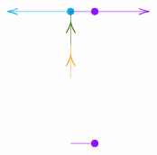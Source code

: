 \documentclass[12pt]{article}
\begin{document}
\[\begin{tikzpicture}[x=0.75pt,y=0.75pt,yscale=-1,xscale=1]
    \draw [color={rgb, 255:red, 144; green, 19; blue, 254 }  ,draw opacity=1 ]   (119.98,199.6) -- (145.63,199.6) ;
    \draw [shift={(145.63,199.6)}, rotate = 0] [color={rgb, 255:red, 144; green, 19; blue, 254 }  ,draw opacity=1 ][fill={rgb, 255:red, 144; green, 19; blue, 254 }  ,fill opacity=1 ][line width=0.75]      (0, 0) circle [x radius= 3.35, y radius= 3.35]   ;
    \draw [color={rgb, 255:red, 144; green, 19; blue, 254 }  ,draw opacity=1 ]   (145.63,60.46) -- (201.55,60.46) ;
    \draw [shift={(203.55,60.46)}, rotate = 180] [color={rgb, 255:red, 144; green, 19; blue, 254 }  ,draw opacity=1 ][line width=0.75]    (10.93,-3.29) .. controls (6.95,-1.4) and (3.31,-0.3) .. (0,0) .. controls (3.31,0.3) and (6.95,1.4) .. (10.93,3.29)   ;
    \draw [color=cyan  ,draw opacity=1 ]   (119.98,60.46) -- (54.75,60.46) ;
    \draw [shift={(52.75,60.46)}, rotate = 360] [color=cyan  ,draw opacity=1 ][line width=0.75]    (10.93,-3.29) .. controls (6.95,-1.4) and (3.31,-0.3) .. (0,0) .. controls (3.31,0.3) and (6.95,1.4) .. (10.93,3.29)   ;
    \draw [shift={(119.98,60.46)}, rotate = 180] [color=cyan  ,draw opacity=1 ][fill=cyan  ,fill opacity=1 ][line width=0.75]      (0, 0) circle [x radius= 3.35, y radius= 3.35]   ;
    \draw [color={rgb, 255:red, 144; green, 19; blue, 254 }  ,draw opacity=1 ]   (119.98,60.46) -- (145.63,60.46) ;
    \draw [shift={(145.63,60.46)}, rotate = 0] [color={rgb, 255:red, 144; green, 19; blue, 254 }  ,draw opacity=1 ][fill={rgb, 255:red, 144; green, 19; blue, 254 }  ,fill opacity=1 ][line width=0.75]      (0, 0) circle [x radius= 3.35, y radius= 3.35]   ;
    \draw [color={rgb, 255:red, 245; green, 166; blue, 35 }  ,draw opacity=1 ]   (119.98,130.39) -- (120.15,95.86) ;
    \draw [shift={(120.1,107.13)}, rotate = 90.28] [color={rgb, 255:red, 245; green, 166; blue, 35 }  ,draw opacity=1 ][line width=0.75]    (10.93,-4.9) .. controls (6.95,-2.3) and (3.31,-0.67) .. (0,0) .. controls (3.31,0.67) and (6.95,2.3) .. (10.93,4.9)   ;
    \draw [color={rgb, 255:red, 65; green, 117; blue, 5 }  ,draw opacity=1 ]   (120.15,95.86) -- (120.15,60.46) ;
    \draw [shift={(120.15,72.16)}, rotate = 90] [color={rgb, 255:red, 65; green, 117; blue, 5 }  ,draw opacity=1 ][line width=0.75]    (10.93,-4.9) .. controls (6.95,-2.3) and (3.31,-0.67) .. (0,0) .. controls (3.31,0.67) and (6.95,2.3) .. (10.93,4.9)   ;

\end{tikzpicture}\]
\end{document}
